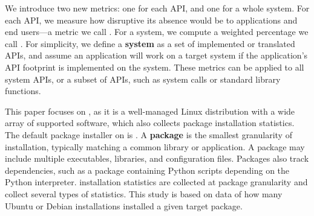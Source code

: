
We introduce two new metrics: one for each API, and one for a whole system.
For each API, we measure how disruptive its absence
would be to applications and end users---a metric we call {\bf  \usagemetric{}}.
For a system, we compute a weighted percentage we call {\bf \compatmetric{}}. 
For simplicity, we define a {\bf system} as a set of implemented or translated APIs,
and assume an 
application will work on a target system if the application's API footprint is implemented on the system.
These metrics can be applied to all system APIs,
or a subset of APIs,
such as system calls 
or standard library functions.



This paper focuses on \osdist{}, as it is a well-managed Linux distribution with a wide array of 
supported software, which also collects
package installation statistics.
The default package installer on \osdist{} is \osinstaller{}.
A {\bf package} is the smallest granularity of installation, typically
matching a common library or application.
A package may include
multiple executables, libraries, and configuration files.
Packages also track dependencies, such as a package containing 
Python scripts depending on the Python interpreter.
\osdist{} installation statistics are collected at package granularity
and collect several types of statistics.
This study is based on
data of how many
Ubuntu or Debian installations
installed a given target package.

